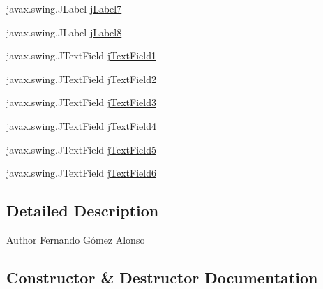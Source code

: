 \begin{DoxyCompactItemize}
\item 
javax.\+swing.\+J\+Label \mbox{\hyperlink{class_interfaz_package_1_1_consulta_busqueda_a999fbcac6f0a6a7bfc57c17612ea2605}{j\+Label7}}
\item 
javax.\+swing.\+J\+Label \mbox{\hyperlink{class_interfaz_package_1_1_consulta_busqueda_ade14e21c50a0fe22a685656e3815a253}{j\+Label8}}
\item 
javax.\+swing.\+J\+Text\+Field \mbox{\hyperlink{class_interfaz_package_1_1_consulta_busqueda_a268df17df2147b480825a6af3128683e}{j\+Text\+Field1}}
\item 
javax.\+swing.\+J\+Text\+Field \mbox{\hyperlink{class_interfaz_package_1_1_consulta_busqueda_aa92702c5bdc2128ce8e45ce2edd99543}{j\+Text\+Field2}}
\item 
javax.\+swing.\+J\+Text\+Field \mbox{\hyperlink{class_interfaz_package_1_1_consulta_busqueda_a1898d78ec07cfb8e5e74b50bce3e6239}{j\+Text\+Field3}}
\item 
javax.\+swing.\+J\+Text\+Field \mbox{\hyperlink{class_interfaz_package_1_1_consulta_busqueda_a1955bd4179b98e109c23fb701af55b5d}{j\+Text\+Field4}}
\item 
javax.\+swing.\+J\+Text\+Field \mbox{\hyperlink{class_interfaz_package_1_1_consulta_busqueda_a62b77207a9f1d648087f776c36b92c4a}{j\+Text\+Field5}}
\item 
javax.\+swing.\+J\+Text\+Field \mbox{\hyperlink{class_interfaz_package_1_1_consulta_busqueda_a98f9196a81f18bfd45672e1c4605d68a}{j\+Text\+Field6}}
\end{DoxyCompactItemize}


\subsection{Detailed Description}
\begin{DoxyAuthor}{Author}
Fernando Gómez Alonso 
\end{DoxyAuthor}


\subsection{Constructor \& Destructor Documentation}
\mbox{\label{class_interfaz_package_1_1_consulta_busqueda_a0947d604c6fd72d808f32c4d3f9b2cc9}} 
